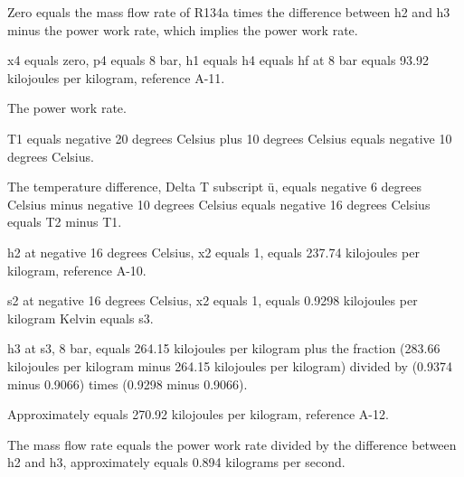 Zero equals the mass flow rate of R134a times the difference between h2 and h3 minus the power work rate, which implies the power work rate.

x4 equals zero, p4 equals 8 bar, h1 equals h4 equals hf at 8 bar equals 93.92 kilojoules per kilogram, reference A-11.

The power work rate.

T1 equals negative 20 degrees Celsius plus 10 degrees Celsius equals negative 10 degrees Celsius.

The temperature difference, Delta T subscript ü, equals negative 6 degrees Celsius minus negative 10 degrees Celsius equals negative 16 degrees Celsius equals T2 minus T1.

h2 at negative 16 degrees Celsius, x2 equals 1, equals 237.74 kilojoules per kilogram, reference A-10.

s2 at negative 16 degrees Celsius, x2 equals 1, equals 0.9298 kilojoules per kilogram Kelvin equals s3.

h3 at s3, 8 bar, equals 264.15 kilojoules per kilogram plus the fraction (283.66 kilojoules per kilogram minus 264.15 kilojoules per kilogram) divided by (0.9374 minus 0.9066) times (0.9298 minus 0.9066).

Approximately equals 270.92 kilojoules per kilogram, reference A-12.

The mass flow rate equals the power work rate divided by the difference between h2 and h3, approximately equals 0.894 kilograms per second.